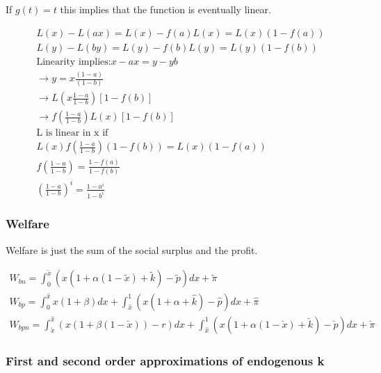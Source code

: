 If $g(t)= t$ this implies that the function is eventually linear. 

\begin{align}
L(x)-L(a x) = L(x) - f(a)L(x) = L(x)(1-f(a)) \\
L(y)-L(b y) = L(y) - f(b)L(y) = L(y)(1-f(b)) \\
\text{Linearity  implies:}
x-ax = y-yb \\
\rightarrow y = x \frac{(1-a)}{(1-b)} \\
\rightarrow L\left(x \frac{1-a}{1-b}\right)[1-f(b)] \\
\rightarrow f\left( \frac{1-a}{1-b}\right)L(x)[1-f(b)] \\
\text{L is linear in x if} \\
L(x)f\left(\frac{1-a}{1-b}\right)(1-f(b)) = L(x)(1-f(a)) \\
f\left(\frac{1-a}{1-b} \right) = \frac{1-f(a)}{1-f(b)} \\
\left(\frac{1-a}{1-b} \right)^i = \frac{1-a^i}{1-b^i} 
\end{align}


\subsubsection{Welfare}

Welfare is just the sum of the social surplus and the profit.

\begin{align*}
W_{bn} = \int^{\tilde{x}}_0 \left(x(1+\alpha(1-\tilde{x})+\tilde{k})-\tilde{p} \right) dx + \tilde{\pi}  \\
W_{bp} = \int^{\hat{x}}_0 x(1+\beta) dx +\int^{1}_{\hat{x}} \left(x(1+\alpha+\hat{k}) - \hat{p} \right) dx + \hat{\pi} \\
W_{bpn} =
\int^{\hat{x}}_{\check{x}} \left(x(1+\beta(1-\check{x}))-r \right)dx +\int^{1}_{\hat{x}} \left(x(1+\alpha(1-\check{x})+\check{k}) - \check{p} \right) dx + \check{\pi}
\end{align*}

\subsubsection{First and second order approximations of endogenous k}

